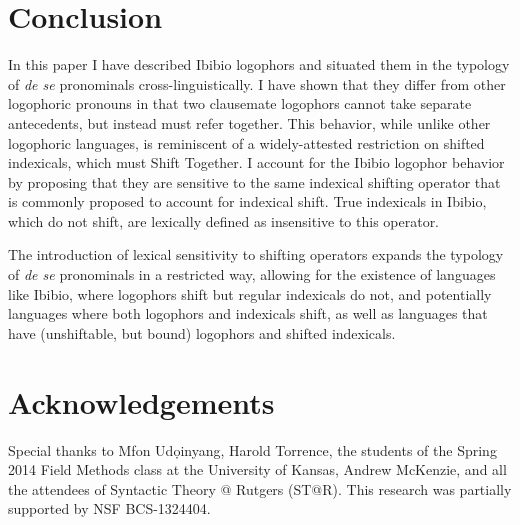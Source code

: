 \documentclass[output=paper]{langscibook}
\begin{document}
\section{Conclusion}

In this paper I have described Ibibio logophors and situated them in the typology of \textit{de se} pronominals cross-linguistically. I have shown that they differ from other logophoric pronouns in that two clausemate logophors cannot take separate antecedents, but instead must refer together. This behavior, while unlike other logophoric languages, is reminiscent of a widely-attested restriction on shifted indexicals, which must Shift Together. I account for the Ibibio logophor behavior by proposing that they are sensitive to the same indexical shifting operator that is commonly proposed to account for indexical shift. True indexicals in Ibibio, which do not shift, are lexically defined as insensitive to this operator.

The introduction of lexical sensitivity to shifting operators expands the typology of \textit{de se} pronominals in a restricted way, allowing for the existence of languages like Ibibio, where logophors shift but regular indexicals do not, and potentially languages where both logophors and indexicals shift, as well as languages that have (unshiftable, but bound) logophors and shifted indexicals.


\section*{Acknowledgements}
Special thanks to Mfon Ud\d{o}inyang, Harold Torrence, the students of the Spring 2014 Field Methods class at the University of Kansas, Andrew McKenzie, and all the attendees of Syntactic Theory @ Rutgers (ST@R). This research was partially supported by NSF BCS-1324404.



{\sloppy \printbibliography[heading=subbibliography,notkeyword=this]}
\end{document}
